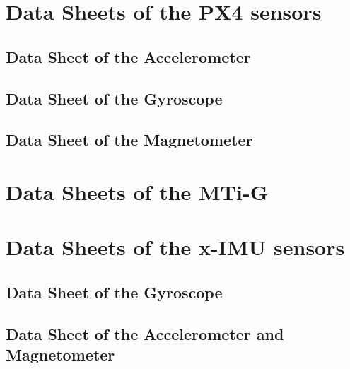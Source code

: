 \chapter{Data Sheets of the PX4 sensors}\label{ds}
\section{Data Sheet of the Accelerometer}\label{ds_acc}

\section{Data Sheet of the Gyroscope}\label{ds_gyro}

\section{Data Sheet of the Magnetometer}\label{ds_mag}

\chapter{Data Sheets of the MTi-G}\label{ds_mti-g}

\chapter{Data Sheets of the x-IMU sensors}\label{ds_ximu}
\section{Data Sheet of the Gyroscope}

\section{Data Sheet of the Accelerometer and Magnetometer}


